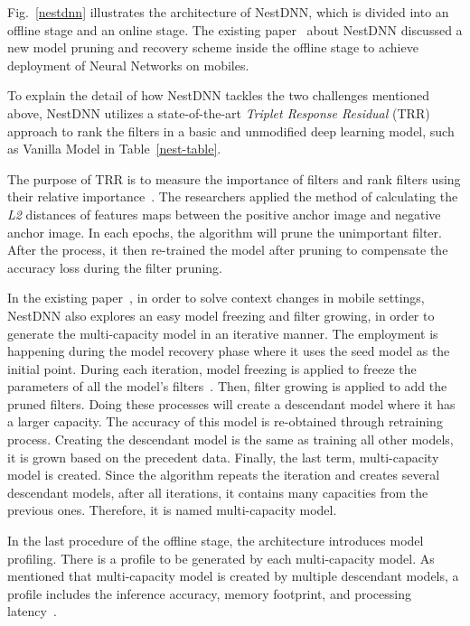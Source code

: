 \documentclass{article}
\begin{document}
Fig.~\ref{nestdnn} illustrates the architecture of NestDNN, which is divided into an offline stage and an online stage. The existing paper~\cite{fang2018nestdnn} about NestDNN discussed a new model pruning and recovery scheme inside the offline stage to achieve deployment of Neural Networks on mobiles. 

To explain the detail of how NestDNN tackles the two challenges mentioned above, NestDNN utilizes a state-of-the-art \textit{Triplet Response Residual} (TRR) approach to rank the filters in a basic and unmodified deep learning model, such as Vanilla Model in Table~\ref{nest-table}. 

The purpose of TRR is to measure the importance of filters and rank filters using their relative importance~\cite{fang2018nestdnn}. The researchers applied the method of calculating the \textit{L2} distances of features maps between the positive anchor image and negative anchor image. In each epochs, the algorithm will prune the unimportant filter. After the process, it then re-trained the model after pruning to compensate the accuracy loss during the filter pruning. 

In the existing paper~\cite{fang2018nestdnn}, in order to solve context changes in mobile settings, NestDNN also explores an easy model freezing and filter growing, in order to generate the multi-capacity model in an iterative manner. The employment is happening during the model recovery phase where it uses the seed model as the initial point. During each iteration, model freezing is applied to freeze the parameters of all the model's filters~\cite{fang2018nestdnn}. Then, filter growing is applied to add the pruned filters. Doing these processes will create a descendant model where it has a larger capacity. The accuracy of this model is re-obtained through retraining process. Creating the descendant model is the same as training all other models, it is grown based on the precedent data. Finally, the last term, multi-capacity model is created. Since the algorithm repeats the iteration and creates several descendant models, after all iterations, it contains many capacities from the previous ones. Therefore, it is named multi-capacity model. 

In the last procedure of the offline stage, the architecture introduces model profiling. There is a profile to be generated by each multi-capacity model. As mentioned that multi-capacity model is created by multiple descendant models, a profile includes the inference accuracy, memory footprint, and processing latency~\cite{fang2018nestdnn}. 
\end{document}
